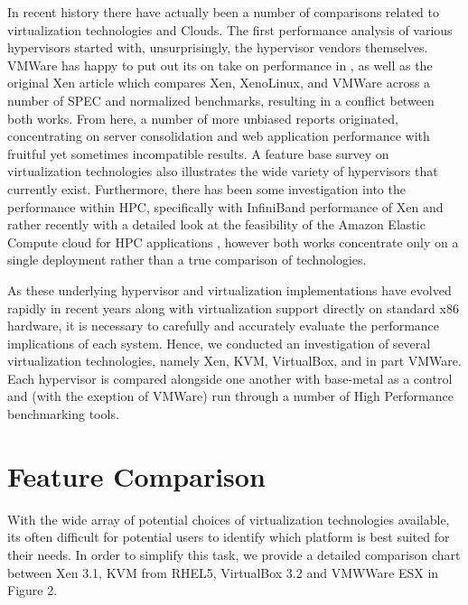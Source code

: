 In recent history there have actually been a number of comparisons related to virtualization technologies and Clouds.  The first performance analysis of various hypervisors started with, unsurprisingly, the hypervisor vendors themselves. VMWare has happy to put out its on take on performance in \cite{adams2006comparison}, as well as the original Xen article \cite{Barham2003} which compares Xen, XenoLinux, and VMWare across a number of SPEC and normalized benchmarks, resulting in a conflict between both works.  From here, a number of more unbiased reports originated, concentrating on server consolidation and web application performance \cite{padala2007performance, koh2007analysis, rixner2008network} with fruitful yet sometimes incompatible results.  A feature base survey on virtualization technologies \cite{nanda2005survey} also illustrates the wide variety of hypervisors that currently exist. Furthermore, there has been some investigation into the performance within HPC, specifically with InfiniBand performance of Xen \cite{ranadive2008performance} and rather recently with a detailed look at the feasibility of the Amazon Elastic Compute cloud for HPC applications \cite{jackson2010performance}, however both works concentrate only on a single deployment rather than a true comparison of technologies.


As these underlying hypervisor and virtualization implementations have evolved rapidly in recent years along with virtualization support directly on standard x86 hardware, it is necessary to carefully and accurately evaluate the performance implications of each system.  Hence, we conducted an investigation of several virtualization technologies, namely Xen, KVM, VirtualBox, and in part VMWare. Each hypervisor is compared alongside one another with base-metal as a control and (with the exeption of VMWare) run through a number of High Performance benchmarking tools.  



\section{Feature Comparison}

With the wide array of potential choices of virtualization technologies available, its often difficult for potential users to identify which platform is best suited for their needs.  In order to simplify this task, we provide a detailed comparison chart between Xen 3.1, KVM from RHEL5, VirtualBox 3.2 and VMWWare  ESX in Figure 2.  

